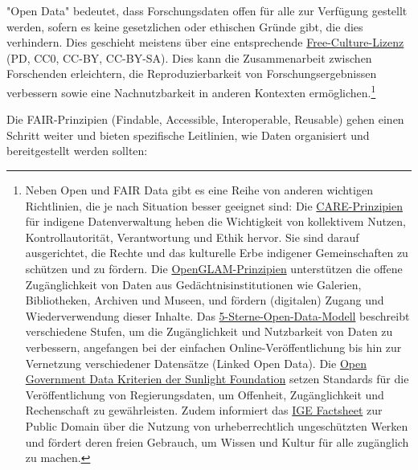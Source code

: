 \documentclass[
  letterpaper,
  DIV=11,
  numbers=noendperiod,
  landscape,
  a4paper,
  geometry:margin=1in]{scrartcl}
\begin{document}
"Open Data" bedeutet, dass Forschungsdaten offen für alle zur Verfügung
gestellt werden, sofern es keine gesetzlichen oder ethischen Gründe
gibt, die dies verhindern. Dies geschieht meistens über eine
entsprechende
\href{https://creativecommons.org/share-your-work/public-domain/freeworks/}{Free-Culture-Lizenz}
(PD, CC0, CC-BY, CC-BY-SA). Dies kann die Zusammenarbeit zwischen
Forschenden erleichtern, die Reproduzierbarkeit von
Forschungsergebnissen verbessern sowie eine Nachnutzbarkeit in anderen
Kontexten ermöglichen.\footnote{Neben Open und FAIR Data gibt es eine
  Reihe von anderen wichtigen Richtlinien, die je nach Situation besser
  geeignet sind: Die
  \href{https://www.gida-global.org/care}{CARE-Prinzipien} für indigene
  Datenverwaltung heben die Wichtigkeit von kollektivem Nutzen,
  Kontrollautorität, Verantwortung und Ethik hervor. Sie sind darauf
  ausgerichtet, die Rechte und das kulturelle Erbe indigener
  Gemeinschaften zu schützen und zu fördern. Die
  \href{https://openglam.org/principles/}{OpenGLAM-Prinzipien}
  unterstützen die offene Zugänglichkeit von Daten aus
  Gedächtnisinstitutionen wie Galerien, Bibliotheken, Archiven und
  Museen, und fördern (digitalen) Zugang und Wiederverwendung dieser
  Inhalte. Das
  \href{https://5stardata.info/de/}{5-Sterne-Open-Data-Modell}
  beschreibt verschiedene Stufen, um die Zugänglichkeit und Nutzbarkeit
  von Daten zu verbessern, angefangen bei der einfachen
  Online-Veröffentlichung bis hin zur Vernetzung verschiedener
  Datensätze (Linked Open Data). Die
  \href{https://sunlightfoundation.com/opendataguidelines/}{Open
  Government Data Kriterien der Sunlight Foundation} setzen Standards
  für die Veröffentlichung von Regierungsdaten, um Offenheit,
  Zugänglichkeit und Rechenschaft zu gewährleisten. Zudem informiert das
  \href{https://www.ige.ch/en/protecting-your-ip/copyright/using-a-work/public-domain}{IGE
  Factsheet} zur Public Domain über die Nutzung von urheberrechtlich
  ungeschützten Werken und fördert deren freien Gebrauch, um Wissen und
  Kultur für alle zugänglich zu machen.}

Die FAIR-Prinzipien (Findable, Accessible, Interoperable, Reusable)
gehen einen Schritt weiter und bieten spezifische Leitlinien, wie Daten
organisiert und bereitgestellt werden sollten:
\end{document}
